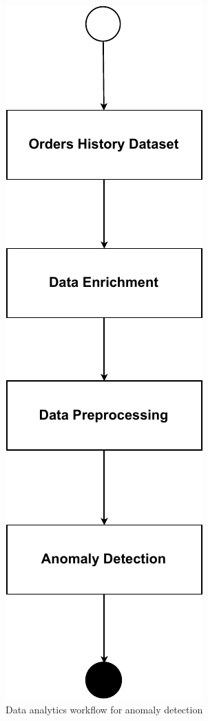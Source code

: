 \documentclass[12pt]{article}
\begin{document}
	\begin{figure}[!ht]
		\centering
		\includegraphics[scale=0.8]{figures/met-flow.pdf}
		\caption{Data analytics workflow for anomaly detection}
		\label{fig_metodology_flow}
	\end{figure}
\end{document}
